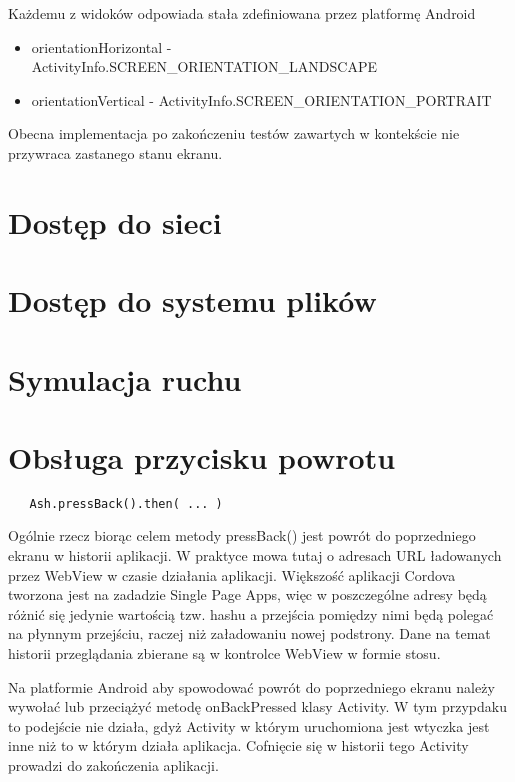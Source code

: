 \documentclass[brudnopis]{xmgr}
\begin{document}
Każdemu z widoków odpowiada stała zdefiniowana przez platformę Android
\begin{itemize}
  \item orientationHorizontal - ActivityInfo.SCREEN\_ORIENTATION\_LANDSCAPE
  \item orientationVertical - ActivityInfo.SCREEN\_ORIENTATION\_PORTRAIT
\end{itemize}

Obecna implementacja po zakończeniu testów zawartych w kontekście nie przywraca zastanego stanu ekranu.

\section{Dostęp do sieci}

\section{Dostęp do systemu plików}

\section{Symulacja ruchu}

\section{Obsługa przycisku powrotu}

\begin{lstlisting}
   Ash.pressBack().then( ... ) 
\end{lstlisting}

Ogólnie rzecz biorąc celem metody pressBack() jest powrót do poprzedniego ekranu w historii aplikacji. W praktyce mowa tutaj o adresach URL ładowanych przez WebView w czasie działania aplikacji. Większość aplikacji Cordova tworzona jest na zadadzie Single Page Apps, więc w poszczególne adresy będą różnić się jedynie wartością tzw. hashu a przejścia pomiędzy nimi będą polegać na płynnym przejściu, raczej niż załadowaniu nowej podstrony. Dane na temat historii przeglądania zbierane są w kontrolce WebView w formie stosu.

Na platformie Android aby spowodować powrót do poprzedniego ekranu należy wywołać lub przeciążyć metodę onBackPressed klasy Activity. W tym przypdaku to podejście nie działa, gdyż Activity w którym uruchomiona jest wtyczka jest inne niż to w którym działa aplikacja. Cofnięcie się w historii tego Activity prowadzi do zakończenia aplikacji. 
\end{document}
